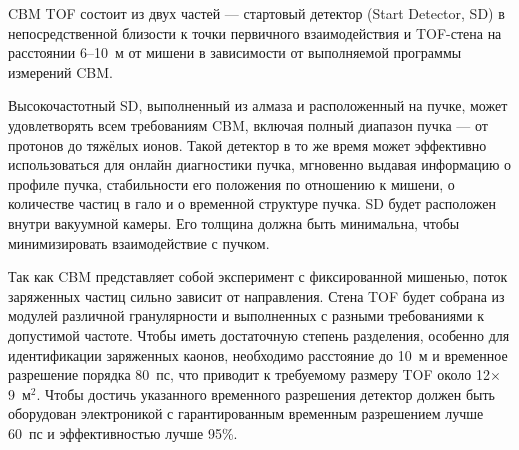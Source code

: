 CBM TOF состоит из двух частей --- стартовый детектор (Start Detector, SD) в непосредственной близости к точки первичного взаимодействия и TOF-стена на расстоянии 6--10~м от мишени в зависимости от выполняемой программы измерений CBM.

Высокочастотный SD, выполненный из алмаза и расположенный на пучке, может удовлетворять всем требованиям CBM, включая полный диапазон пучка --- от протонов до тяжёлых ионов. Такой детектор в то же время может эффективно использоваться для онлайн диагностики пучка, мгновенно выдавая информацию о профиле пучка, стабильности его положения по отношению к мишени, о количестве частиц в гало и о временной структуре пучка. SD будет расположен внутри вакуумной камеры. Его толщина должна быть минимальна, чтобы минимизировать взаимодействие с пучком.



Так как CBM представляет собой эксперимент с фиксированной мишенью, поток заряженных частиц сильно зависит от направления. Стена TOF будет собрана из модулей различной гранулярности и выполненных с разными требованиями к допустимой частоте. Чтобы иметь достаточную степень разделения, особенно для идентификации заряженных каонов, необходимо расстояние до 10~м и временное разрешение порядка 80~пс, что приводит к требуемому размеру TOF около 12$\times$9~м$^2$. Чтобы достичь указанного временного разрешения детектор должен быть оборудован электроникой с гарантированным временным разрешением лучше 60~пс и эффективностью лучше 95\%.

